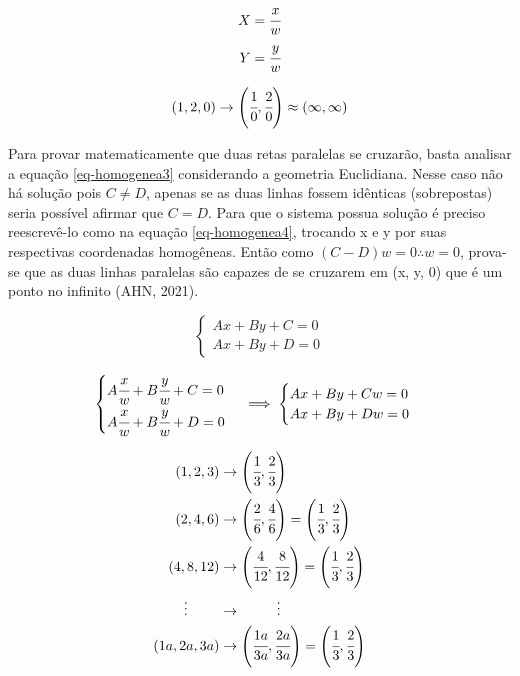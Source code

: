 \begin{equation} \label{eq-homogenea}
	\begin{aligned}
	X = \cfrac{x}{w} \\
	Y = \cfrac{y}{w} 
	\end{aligned}
\end{equation}

\begin{equation} \label{eq-homogenea2}
	\begin{aligned}
		(1,2,0) \rightarrow \left(\cfrac{1}{0}, \cfrac{2}{0}\right) \approx (\infty,\infty)
	\end{aligned}
\end{equation}

Para provar matematicamente que duas retas paralelas se cruzarão, basta analisar a equação \ref{eq-homogenea3} considerando a geometria Euclidiana. Nesse caso não há solução pois $ C \neq D $, apenas se as duas linhas fossem idênticas (sobrepostas) seria possível afirmar que $ C = D $. Para que o sistema possua solução é preciso reescrevê-lo como na equação \ref{eq-homogenea4}, trocando x e y por suas respectivas coordenadas homogêneas. Então como $ (C-D)w = 0 \therefore w=0 $, prova-se que as duas linhas paralelas são capazes de se cruzarem em (x, y, 0) que é um ponto no infinito (AHN, 2021).

\begin{equation} \label{eq-homogenea3}
	\begin{cases}
	Ax + By + C = 0 \\
	Ax + By + D = 0
	\end{cases}
\end{equation}

\begin{equation} \label{eq-homogenea4}
	\begin{cases}
	A\cfrac{x}{w} + B\cfrac{y}{w} + C = 0 \\
	A\cfrac{x}{w} + B\cfrac{y}{w} + D = 0
	\end{cases}
	\implies
	\begin{cases}
		Ax + By + Cw = 0 \\
		Ax + By + Dw = 0
	\end{cases}
\end{equation}

\begin{equation} \label{eq-homogenea5}
	\begin{split}
	(1,2,3) & \rightarrow \left(\cfrac{1}{3},\cfrac{2}{3}\right) \\
	(2,4,6) & \rightarrow \left(\cfrac{2}{6},\cfrac{4}{6}\right) = \left(\cfrac{1}{3},\cfrac{2}{3}\right) \\
	(4,8,12) & \rightarrow \left(\cfrac{4}{12},\cfrac{8}{12}\right) = \left(\cfrac{1}{3},\cfrac{2}{3}\right) \\
	\vdots \hspace{.8cm} & \rightarrow \hspace{.9cm} \vdots \\
	(1a,2a,3a) & \rightarrow \left(\cfrac{1a}{3a},\cfrac{2a}{3a}\right) = \left(\cfrac{1}{3},\cfrac{2}{3}\right)
	\end{split}
\end{equation}
